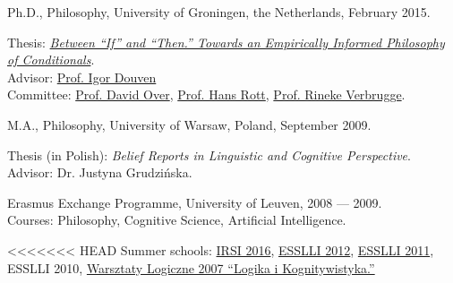 \documentclass[11pt,article,oneside]{memoir}
\begin{document}
\bigskip



\ind Ph.D., Philosophy, University of Groningen, the Netherlands, February
2015.

\ind \hspace{0.35in} \footnotesize 
Thesis: \emph{\href{http://karolinakrzyzanowska.com/pdfs/krzyzanowska-phd-final.pdf}{Between ``If'' and ``Then.'' Towards an Empirically Informed Philosophy of Conditionals}}. \\
Advisor: \href{https://www.researchgate.net/profile/Igor_Douven}{Prof. Igor Douven}\\
Committee: \href{https://www.dur.ac.uk/psychology/staff/?id=4610}{Prof. David Over}, \href{http://www.uni-regensburg.de/philosophie-kunst-geschichte-gesellschaft/theoretische-philosophie/personen/prof-dr-hans-rott/}{Prof. Hans Rott}, \href{http://www.rinekeverbrugge.nl}{Prof. Rineke Verbrugge}. 
\normalsize 
\vspace{0.05in}

\ind M.A., Philosophy, University of Warsaw, Poland, September 2009. 

\ind \hspace{0.35in} \footnotesize Thesis (in Polish): \emph{Belief Reports in Linguistic and Cognitive Perspective}. \\
Advisor: Dr. Justyna Grudzińska. 
\normalsize \vspace{0.01in}
    

\ind Erasmus Exchange Programme, University of Leuven, 2008 --- 2009.\\ 
    \ind \hspace{0.35in} \footnotesize 
    Courses: Philosophy, Cognitive Science, Artificial Intelligence.
	\normalsize \vspace{0.01in}

<<<<<<< HEAD
\ind Summer schools: \href{https://irsi2016.de}{IRSI 2016}, \href{http://www.esslli2012.pl}{ESSLLI 2012}, \href{http://esslli2011.ijs.si}{ESSLLI 2011},  ESSLLI 2010, \href{http://www.logika.uw.edu.pl/warsztaty2007/}{Warsztaty Logiczne 2007 ``Logika i Kognitywistyka.''}
\end{document}
